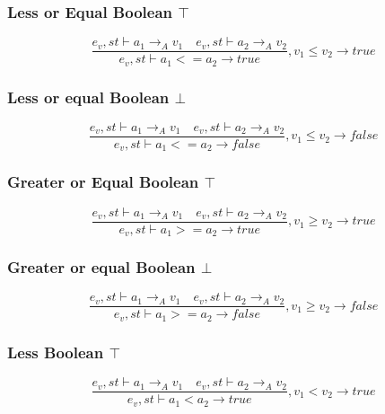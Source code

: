 \subsubsection{Less or Equal Boolean $\top$}
\begin{equation}
	\frac { { e }_{ v },st\vdash { a }_{ 1 }{ \rightarrow  }_{ A }{ v }_{ 1 }\quad { e }_{ v },st\vdash { a }_{ 2 }{ \rightarrow  }_{ A }{ v }_{ 2 } }{ { e }_{ v },st\vdash { a }_{ 1 }<={ a }_{ 2 }{ \rightarrow  }true } ,{ v }_{ 1 }\le{ v }_{ 2 }\rightarrow true
\end{equation}

\subsubsection{Less or equal Boolean $\bot$}
\begin{equation}
	\frac { { e }_{ v },st\vdash { a }_{ 1 }{ \rightarrow  }_{ A }{ v }_{ 1 }\quad { e }_{ v },st\vdash { a }_{ 2 }{ \rightarrow  }_{ A }{ v }_{ 2 } }{ { e }_{ v },st\vdash { a }_{ 1 }<={ a }_{ 2 }{ \rightarrow  }false } ,{ v }_{ 1 }\le{ v }_{ 2 }\rightarrow false
\end{equation}

\subsubsection{Greater or Equal Boolean $\top$}
\begin{equation}
	\frac { { e }_{ v },st\vdash { a }_{ 1 }{ \rightarrow  }_{ A }{ v }_{ 1 }\quad { e }_{ v },st\vdash { a }_{ 2 }{ \rightarrow  }_{ A }{ v }_{ 2 } }{ { e }_{ v },st\vdash { a }_{ 1 }>={ a }_{ 2 }{ \rightarrow  }true } ,{ v }_{ 1 }\ge{ v }_{ 2 }\rightarrow true
\end{equation}

\subsubsection{Greater or equal Boolean $\bot$}
\begin{equation}
	\frac { { e }_{ v },st\vdash { a }_{ 1 }{ \rightarrow  }_{ A }{ v }_{ 1 }\quad { e }_{ v },st\vdash { a }_{ 2 }{ \rightarrow  }_{ A }{ v }_{ 2 } }{ { e }_{ v },st\vdash { a }_{ 1 }>={ a }_{ 2 }{ \rightarrow  }false } ,{ v }_{ 1 }\ge{ v }_{ 2 }\rightarrow false
\end{equation}

\subsubsection{Less Boolean $\top$}
\begin{equation}
	\frac { { e }_{ v },st\vdash { a }_{ 1 }{ \rightarrow  }_{ A }{ v }_{ 1 }\quad { e }_{ v },st\vdash { a }_{ 2 }{ \rightarrow  }_{ A }{ v }_{ 2 } }{ { e }_{ v },st\vdash { a }_{ 1 }<{ a }_{ 2 }{ \rightarrow  }true } ,{ v }_{ 1 }<{ v }_{ 2 }\rightarrow true
\end{equation}

